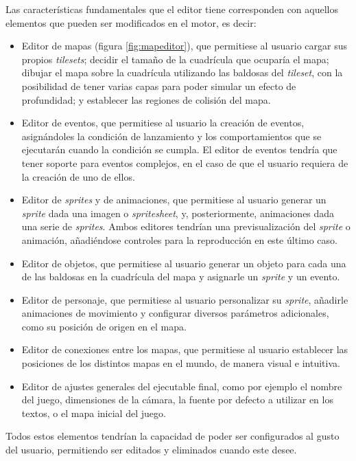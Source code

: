Las características fundamentales que el editor tiene corresponden con aquellos elementos que pueden ser modificados en el motor, es decir:
\begin{itemize}
	\item Editor de mapas (figura \ref{fig:mapeditor}), que permitiese al usuario cargar sus propios \textit{tilesets}; decidir el tamaño de la cuadrícula que ocuparía el mapa; dibujar el mapa sobre la cuadrícula utilizando las baldosas del \textit{tileset}, con la posibilidad de tener varias capas para poder simular un efecto de profundidad; y establecer las regiones de colisión del mapa.
	\item Editor de eventos, que permitiese al usuario la creación de eventos, asignándoles la condición de lanzamiento y los comportamientos que se ejecutarán cuando la condición se cumpla. El editor de eventos tendría que tener soporte para eventos complejos, en el caso de que el usuario requiera de la creación de uno de ellos.
	\item Editor de \textit{sprites} y de animaciones, que permitiese al usuario generar un \textit{sprite} dada una imagen o \textit{spritesheet}, y, posteriormente, animaciones dada una serie de \textit{sprites}. Ambos editores tendrían una previsualización del \textit{sprite} o animación, añadiéndose controles para la reproducción en este último caso. 
	\item Editor de objetos, que permitiese al usuario generar un objeto para cada una de las baldosas en la cuadrícula del mapa y asignarle un \textit{sprite} y un evento.
	\item Editor de personaje, que permitiese al usuario personalizar su \textit{sprite}, añadirle animaciones de movimiento y configurar diversos parámetros adicionales, como su posición de origen en el mapa.
	\item Editor de conexiones entre los mapas, que permitiese al usuario establecer las posiciones de los distintos mapas en el mundo, de manera visual e intuitiva.
	\item Editor de ajustes generales del ejecutable final, como por ejemplo el nombre del juego, dimensiones de la cámara, la fuente por defecto a utilizar en los textos, o el mapa inicial del juego.
\end{itemize} 

Todos estos elementos tendrían la capacidad de poder ser configurados al gusto del usuario, permitiendo ser editados y eliminados cuando este desee.

\medskip

